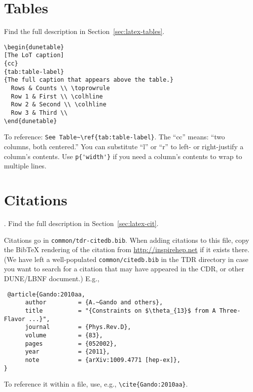 \section{Tables}
\begin{framed}
Find the full description in Section~\ref{sec:latex-tables}.
\begin{verbatim}
\begin{dunetable}
[The LoT caption]
{cc}
{tab:table-label}
{The full caption that appears above the table.}
  Rows & Counts \\ \toprowrule
  Row 1 & First \\ \colhline
  Row 2 & Second \\ \colhline
  Row 3 & Third \\ 
\end{dunetable}
\end{verbatim}
To reference: \verb|See Table~\ref{tab:table-label}|. The ``cc'' means: ``two columns, both centered.'' You can substitute ``l'' or ``r'' to left- or right-justify a column's contents. Use \verb|p{'width'}| if you need a column's contents to wrap to multiple lines.
\end{framed}

\section{Citations}
\begin{framed}.
Find the full description in Section~\ref{sec:latex-cit}.

Citations go in \texttt{common/tdr-citedb.bib}. When adding citations to this file, copy the BibTeX rendering of the citation from \url{http://inspirehep.net} if it exists there. (We have left a well-populated \texttt{common/citedb.bib} in the TDR directory in case you want to search for a citation
 that may have appeared in the CDR, or other DUNE/LBNF document.) E.g.,
\begin{verbatim}
 @article{Gando:2010aa,
      author         = {A.~Gando and others},
      title          = "{Constraints on $\theta_{13}$ from A Three-Flavor ...}",
      journal        = {Phys.Rev.D},
      volume         = {83},
      pages          = {052002},
      year           = {2011},
      note           = {arXiv:1009.4771 [hep-ex]},
}
\end{verbatim}
 To reference it within a file, use, e.g.,  \verb|\cite{Gando:2010aa}|.
\end{framed}

